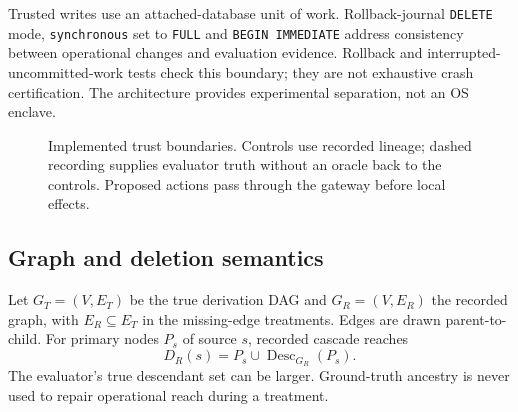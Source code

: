 \documentclass[10pt,letterpaper]{article}
\begin{document}
Trusted writes use an attached-database unit of work. Rollback-journal \texttt{DELETE} mode, \texttt{synchronous}
set to \texttt{FULL} and \texttt{BEGIN IMMEDIATE} address consistency between operational changes and evaluation evidence. Rollback and interrupted-uncommitted-work tests check this boundary; they are not exhaustive crash certification. The architecture provides experimental separation, not an OS enclave.

\begin{figure}[H]
\centering
{}
\caption{Implemented trust boundaries. Controls use recorded lineage; dashed recording supplies evaluator truth without an oracle back to the controls. Proposed actions pass through the gateway before local effects.}
\label{fig:architecture}
\end{figure}

\subsection{Graph and deletion semantics}
Let $G_T=(V,E_T)$ be the true derivation DAG and $G_R=(V,E_R)$ the recorded graph, with $E_R\subseteq E_T$ in the missing-edge treatments. Edges are drawn parent-to-child. For primary nodes $P_s$ of source $s$, recorded cascade reaches
\begin{equation}
 D_R(s)=P_s\cup\operatorname{Desc}_{G_R}(P_s).
\label{eq:cascade}
\end{equation}
The evaluator's true descendant set can be larger. Ground-truth ancestry is never used to repair operational reach during a treatment.
\end{document}
